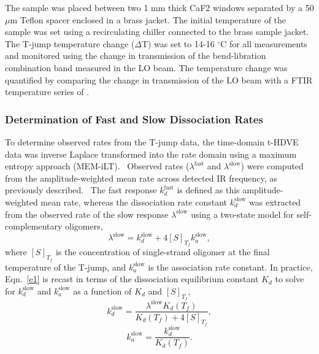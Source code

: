 \documentclass[journal=jpcbfk,manuscript=article]{achemso}
\begin{document}
The sample was placed between two 1 mm thick CaF2 windows separated by a 50 $\mu$m Teflon spacer enclosed in a brass jacket. The initial temperature of the sample was set using a recirculating chiller connected to the brass sample jacket. The T-jump temperature change ($\Delta$T) was set to 14-16 $^\circ$C for all measurements and monitored using the change in transmission of the  bend-libration combination band measured in the LO beam. The temperature change was quantified by comparing the change in transmission of the LO beam with a FTIR temperature series of . 

\subsubsection{Determination of Fast and Slow Dissociation Rates}\label{sec:TjumpAnalysis}

To determine observed rates from the T-jump data, the time-domain t-HDVE data was inverse Laplace transformed into the rate domain using a maximum entropy approach (MEM-iLT).~\citep{Kumar2001OnTimescales} Observed rates ($\lambda^\mathrm{fast}$ and $\lambda^\mathrm{slow}$) were computed from the amplitude-weighted mean rate across detected IR frequency, as previously described.~\citep{Sanstead2018DirectDehybridization} The fast response $k_d^\mathrm{fast}$ is defined as this amplitude-weighted mean rate, whereas the dissociation rate constant $k_d^\mathrm{slow}$ was extracted from the observed rate of the slow response $\lambda^\mathrm{slow}$ using a two-state model for self-complementary oligomers,~\citep{Bernasconi2012RelaxationKinetics}
	\begin{equation}\label{e1}
	\lambda^\mathrm{slow} = k_d^\mathrm{slow} + 4[S]_{T_f}k_a^\mathrm{slow},
	\end{equation}
where $[S]_{T_f}$ is the concentration of single-strand oligomer at the final temperature of the T-jump, and $k_a^\mathrm{slow}$ is the association rate constant. In practice, Eqn.~\ref{e1} is recast in terms of the dissociation equilibrium constant $K_d$ to solve for $k_d^\mathrm{slow}$ and $k_a^\mathrm{slow}$ as a function of $K_d$ and $[S]_{T_f}$,
	\begin{equation}\label{e2a}
	k_d^\mathrm{slow} = \frac{\lambda^\mathrm{slow}K_d(T_f)}{K_d(T_f)+4[S]_{T_f}},
	\end{equation}
	\begin{equation}\label{e2b}
	k_a^\mathrm{slow} = \frac{k_d^\mathrm{slow}}{K_d(T_f)}.
	\end{equation}
\end{document}
